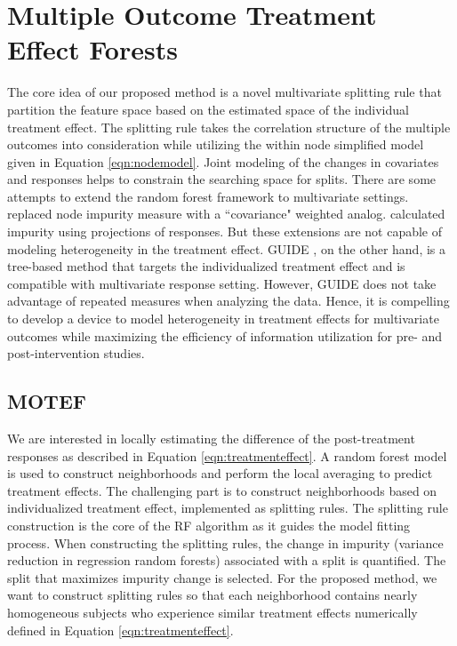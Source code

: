 \documentclass[smallextended]{svjour3}
\begin{document}
\section{Multiple Outcome Treatment Effect Forests}\label{MOTE}
The core idea of our proposed method is a novel multivariate splitting rule that partition the feature space based on the estimated space of the individual treatment effect. The splitting rule takes the correlation structure of the multiple outcomes into consideration while utilizing the within node simplified model given in Equation \eqref{eqn:nodemodel}. Joint modeling of the changes in covariates and responses helps to constrain the searching space for splits. There are some attempts to extend the random forest framework to multivariate settings. \cite{Sega2011} replaced node impurity measure with a ``covariance" weighted analog. \cite{Rainforth2015} calculated impurity using projections of responses. But these extensions are not capable of modeling heterogeneity in the treatment effect. GUIDE \citep{Loh2015}, on the other hand, is a tree-based method that targets the individualized treatment effect and is compatible with multivariate response setting. However, GUIDE does not take advantage of repeated measures when analyzing the data. Hence, it is compelling to develop a device to model heterogeneity in treatment effects for multivariate outcomes while maximizing the efficiency of information utilization for pre- and post-intervention studies.

\subsection{MOTEF}
We are interested in locally estimating the difference of the post-treatment responses as described in Equation \eqref{eqn:treatmenteffect}. A random forest model is used to construct neighborhoods and perform the local averaging to predict treatment effects. The challenging part is to construct neighborhoods based on individualized treatment effect, implemented as splitting rules. The splitting rule construction is the core of the RF algorithm as it guides the model fitting process. When constructing the splitting rules, the change in impurity (variance reduction in regression random forests) associated with a split is quantified. The split that maximizes impurity change is selected. For the proposed method, we want to construct splitting rules so that each neighborhood contains nearly homogeneous subjects who experience similar treatment effects numerically defined in Equation \eqref{eqn:treatmenteffect}. 
\end{document}
